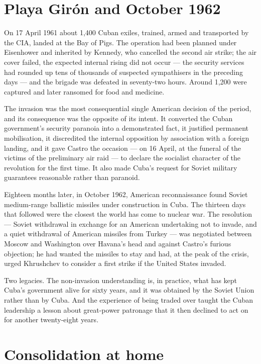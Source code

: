 \section{Playa Gir\'on and October 1962}

On 17 April 1961 about 1,400 Cuban exiles, trained, armed and transported by
the CIA, landed at the Bay of Pigs. The operation had been planned under
Eisenhower and inherited by Kennedy, who cancelled the second air strike; the
air cover failed, the expected internal rising did not occur --- the security
services had rounded up tens of thousands of suspected sympathisers in the
preceding days --- and the brigade was defeated in seventy-two hours. Around
1,200 were captured and later ransomed for food and medicine.

The invasion was the most consequential single American decision of the period,
and its consequence was the opposite of its intent. It converted the Cuban
government's security paranoia into a demonstrated fact, it justified permanent
mobilisation, it discredited the internal opposition by association with a
foreign landing, and it gave Castro the occasion --- on 16 April, at the funeral
of the victims of the preliminary air raid --- to declare the socialist
character of the revolution for the first time. It also made Cuba's request for
Soviet military guarantees reasonable rather than paranoid.

Eighteen months later, in October 1962, American reconnaissance found Soviet
medium-range ballistic missiles under construction in Cuba. The thirteen days
that followed were the closest the world has come to nuclear war. The
resolution --- Soviet withdrawal in exchange for an American undertaking not to
invade, and a quiet withdrawal of American missiles from Turkey --- was
negotiated between Moscow and Washington over Havana's head and against
Castro's furious objection; he had wanted the missiles to stay and had, at the
peak of the crisis, urged Khrushchev to consider a first strike if the United
States invaded.

Two legacies. The non-invasion understanding is, in practice, what has kept
Cuba's government alive for sixty years, and it was obtained by the Soviet
Union rather than by Cuba. And the experience of being traded over taught the
Cuban leadership a lesson about great-power patronage that it then declined to
act on for another twenty-eight years.

\section{Consolidation at home}

